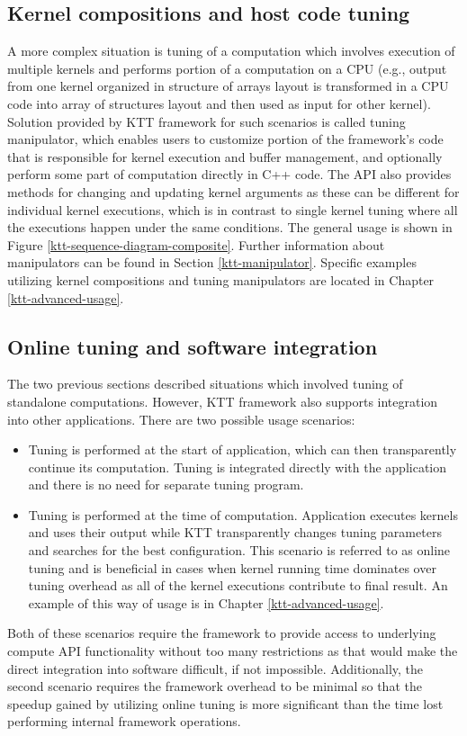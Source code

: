 \documentclass
[
    digital, %
    oneside, %
    table, %
    nolof, %
    nolot, %
    nocover %
]{fithesis3}
\begin{document}
\subsection{Kernel compositions and host code tuning}
A more complex situation is tuning of a computation which involves execution of multiple kernels and performs portion of a computation on a CPU (e.g.,
output from one kernel organized in structure of arrays layout is transformed in a CPU code into array of structures layout and then used as input for
other kernel). Solution provided by KTT framework for such scenarios is called tuning manipulator, which enables users to customize portion of the
framework's code that is responsible for kernel execution and buffer management, and optionally perform some part of computation directly in C++ code.
The API also provides methods for changing and updating kernel arguments as these can be different for individual kernel executions, which is in contrast
to single kernel tuning where all the executions happen under the same conditions. The general usage is shown in Figure \ref{ktt-sequence-diagram-composite}.
Further information about manipulators can be found in Section \ref{ktt-manipulator}. Specific examples utilizing kernel compositions and tuning manipulators
are located in Chapter \ref{ktt-advanced-usage}.

\subsection{Online tuning and software integration}
The two previous sections described situations which involved tuning of standalone computations. However, KTT framework also supports integration into
other applications. There are two possible usage scenarios:
\begin{itemize}
    \item Tuning is performed at the start of application, which can then transparently continue its computation. Tuning is integrated directly with
    the application and there is no need for separate tuning program.
    \item Tuning is performed at the time of computation. Application executes kernels and uses their output while KTT transparently changes tuning
    parameters and searches for the best configuration. This scenario is referred to as online tuning and is beneficial in cases when kernel running
    time dominates over tuning overhead as all of the kernel executions contribute to final result. An example of this way of usage is in Chapter
    \ref{ktt-advanced-usage}.
\end{itemize}
Both of these scenarios require the framework to provide access to underlying compute API functionality without too many restrictions as that would
make the direct integration into software difficult, if not impossible. Additionally, the second scenario requires the framework overhead to be
minimal so that the speedup gained by utilizing online tuning is more significant than the time lost performing internal framework operations.
\end{document}
